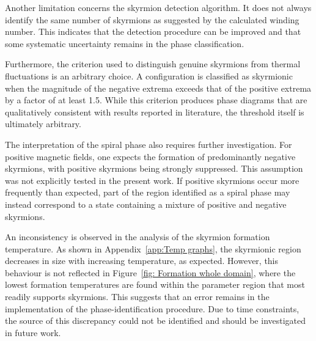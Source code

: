 Another limitation concerns the skyrmion detection algorithm. It does not always identify the same number of skyrmions as suggested by the calculated winding number. This indicates that the detection procedure can be improved and that some systematic uncertainty remains in the phase classification.

Furthermore, the criterion used to distinguish genuine skyrmions from thermal fluctuations is an arbitrary choice. A configuration is classified as skyrmionic when the magnitude of the negative extrema exceeds that of the positive extrema by a factor of at least 1.5. While this criterion produces phase diagrams that are qualitatively consistent with results reported in literature, the threshold itself is ultimately arbitrary.

The interpretation of the spiral phase also requires further investigation. For positive magnetic fields, one expects the formation of predominantly negative skyrmions, with positive skyrmions being strongly suppressed. This assumption was not explicitly tested in the present work. If positive skyrmions occur more frequently than expected, part of the region identified as a spiral phase may instead correspond to a state containing a mixture of positive and negative skyrmions.

An inconsistency is observed in the analysis of the skyrmion formation temperature. As shown in Appendix~\ref{app:Temp graphs}, the skyrmionic region decreases in size with increasing temperature, as expected. However, this behaviour is not reflected in Figure~\ref{fig: Formation whole domain}, where the lowest formation temperatures are found within the parameter region that most readily supports skyrmions. This suggests that an error remains in the implementation of the phase-identification procedure. Due to time constraints, the source of this discrepancy could not be identified and should be investigated in future work.




